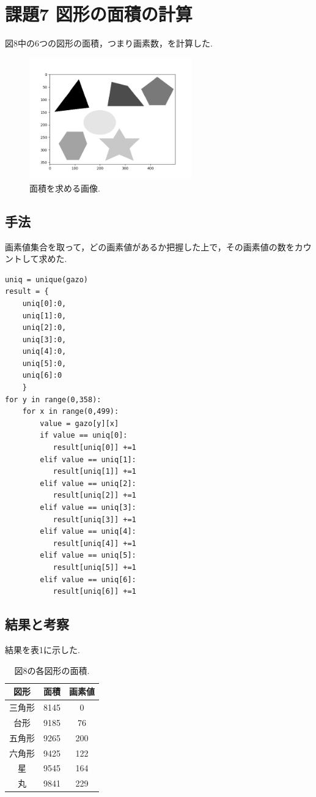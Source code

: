 \documentclass[twocolumn, 10pt,a4j]{jsarticle}
\begin{document}
\section{課題7 図形の面積の計算}
図8中の6つの図形の面積，つまり画素数，を計算した.
\begin{figure}[H]
    \begin{center}
        \includegraphics[width=7cm]{../img/kadai_7.png}
        \caption{面積を求める画像.}
    \end{center}
    \end{figure}

    \subsection{手法}
    画素値集合を取って，どの画素値があるか把握した上で，その画素値の数をカウントして求めた.
\begin{lstlisting}[caption=kadai7.py, label=p4_txt]
uniq = unique(gazo)
result = {
    uniq[0]:0,
    uniq[1]:0,
    uniq[2]:0,
    uniq[3]:0,
    uniq[4]:0,
    uniq[5]:0,
    uniq[6]:0
    }
for y in range(0,358):
    for x in range(0,499):
        value = gazo[y][x]
        if value == uniq[0]:
           result[uniq[0]] +=1
        elif value == uniq[1]:
           result[uniq[1]] +=1
        elif value == uniq[2]:
           result[uniq[2]] +=1
        elif value == uniq[3]:
           result[uniq[3]] +=1
        elif value == uniq[4]:
           result[uniq[4]] +=1
        elif value == uniq[5]:
           result[uniq[5]] +=1
        elif value == uniq[6]:
           result[uniq[6]] +=1
\end{lstlisting}


\subsection{結果と考察}
結果を表1に示した. 
\begin{table}[htb]
    \caption{図8の各図形の面積.}
    \begin{tabular}{ccc}
      図形 & 面積 & 画素値  \\ \hline
      三角形 & 8145 & 0 \\
      台形 & 9185 & 76 \\
      五角形 & 9265 & 200 \\
      六角形 & 9425 & 122 \\
      星 & 9545 & 164 \\
      丸 & 9841 & 229
    \end{tabular}
  \end{table}
\end{document}
